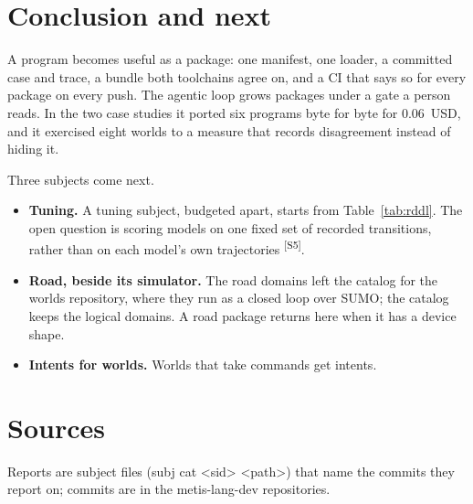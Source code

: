 \documentclass[11pt]{article}
\newcommand{\tool}[1]{{\ttfamily\begingroup\def\_{\textunderscore\allowbreak}#1\endgroup}}
\newcommand{\src}[1]{\textsuperscript{[#1]}}
\begin{document}
\section{Conclusion and next}\label{sec:conclusion}

A program becomes useful as a package: one manifest, one loader, a
committed case and trace, a bundle both toolchains agree on, and a CI that
says so for every package on every push. The agentic loop grows packages
under a gate a person reads. In the two case studies it ported six
programs byte for byte for 0.06~USD, and it exercised eight worlds to a
measure that records disagreement instead of hiding it.

Three subjects come next.
\begin{itemize}[nosep]
\item \textbf{Tuning.} A tuning subject, budgeted apart, starts from
  Table~\ref{tab:rddl}. The open question is scoring models on one fixed
  set of recorded transitions, rather than on each model's own
  trajectories \src{S5}.
\item \textbf{Road, beside its simulator.} The road domains left the
  catalog for the worlds repository, where they run as a closed loop over
  SUMO; the catalog keeps the logical domains. A road package returns here
  when it has a device shape.
\item \textbf{Intents for worlds.} Worlds that take commands get intents.
\end{itemize}

\appendix
\section{Sources}\label{app:sources}

Reports are subject files (\tool{subj cat <sid> <path>}) that name the
commits they report on; commits are in the metis-lang-dev repositories.
\end{document}
